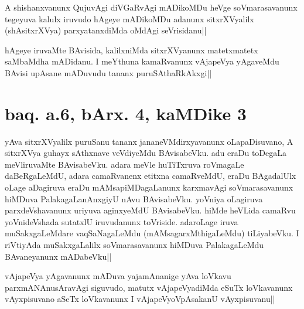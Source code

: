 
\begin{artha}
A shishanxvanunx QujuvAgi diVGaRvAgi mADikoMDu heVge soVmarasavanunx 
tegeyuva kalulx iruvudo hAgeye mADikoMDu adanunx sitxrXVyalilx 
(shAsitxrXVya) parxyatanxdiMda oMdAgi seVrisidanu||
\end{artha}


\begin{artha}
hAgeye iruvaMte BAvisida, kalilxniMda sitxrXVyanunx matetxmatetx 
saMbaMdha mADidanu. I meYthuna kamaRvanunx vAjapeVya yAgaveMdu BAvisi 
upAsane mADuvudu tananx puruSAthaRkAkxgi||
\end{artha}


\section*{baq. a.6, bArx. 4, kaMDike 3}

\stext

\begin{artha}
yAva sitxrXVyalilx puruSanu tananx jananeVMdirxyavanunx oLapaDisuvano, 
A sitxrXVya guhayx sAthxnave veVdiyeMdu BAvisabeVku. adu eraDu toDegaLa 
meVliruvaMte BAvisabeVku. adara meVle huTiTxruva roVmagaLe 
daBeRgaLeMdU, adara camaRvanenx etitxna camaRveMdU, eraDu BAgadalUlx 
oLage aDagiruva eraDu mAMsapiMDagaLanunx karxmavAgi soVmarasavanunx 
hiMDuva PalakagaLanAnxgiyU nAvu BAvisabeVku. yoVniya oLagiruva 
parxdeVshavanunx uriyuva aginxyeMdU BAvisabeVku. hiMde heVLida camaRvu 
yoVnideVshada sutatxlU iruvudanunx toVriside. adaroLage iruva 
muSakxgaLeMdare vaqSaNagaLeMdu (mAMsagarxMthigaLeMdu) tiLiyabeVku. I 
riVtiyAda muSakxgaLalilx soVmarasavanunx hiMDuva PalakagaLeMdu 
BAvaneyanunx mADabeVku|| 
\end{artha}


\begin{artha}
vAjapeVya yAgavanunx mADuva yajamAnanige yAva loVkavu 
parxmANAnusAravAgi siguvudo, matutx vAjapeVyadiMda eSuTx loVkavanunx 
vAyxpisuvano aSeTx loVkavanunx I vAjapeVyoVpAsakanU vAyxpisuvanu||
\end{artha}


